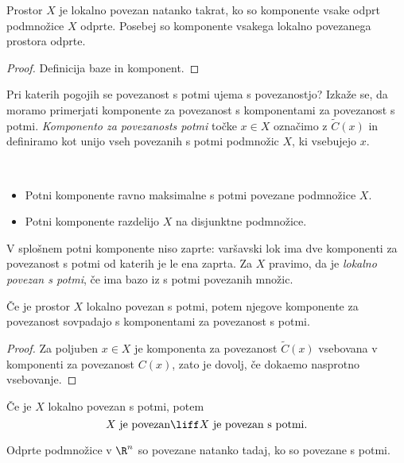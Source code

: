 \begin{trditev}
    Prostor $X$ je lokalno povezan natanko takrat, ko so komponente vsake odprt podmnožice $X$ odprte. Posebej so komponente vsakega lokalno povezanega prostora odprte.
\end{trditev}

\begin{proof}
    Definicija baze in komponent.
\end{proof}

Pri katerih pogojih se povezanost s potmi ujema s povezanostjo? Izkaže se, da moramo primerjati komponente za povezanost s komponentami za povezanost s potmi. \emph{Komponento za povezanosts potmi} točke $x \in X$ označimo z $\widetilde{C}(x)$ in definiramo kot unijo vseh povezanih s potmi podmnožic $X$, ki vsebujejo $x$.

\begin{opomba}
    \ 
    \begin{itemize}
        \item Potni komponente ravno maksimalne s potmi povezane podmnožice $X$.
        \item Potni komponente razdelijo $X$ na disjunktne podmnožice.
    \end{itemize}

    V splošnem potni komponente niso zaprte: varšavski lok ima dve komponenti za povezanost s potmi od katerih je le ena zaprta. Za $X$ pravimo, da je \emph{lokalno povezan s potmi}, če ima bazo iz s potmi povezanih množic.
\end{opomba}

\begin{izrek}
    Če je prostor $X$ lokalno povezan s potmi, potem njegove komponente za povezanost sovpadajo s komponentami za povezanost s potmi.
\end{izrek}

\begin{proof}
    Za poljuben $x \in X$ je komponenta za povezanost $\widetilde{C}(x)$ vsebovana v komponenti za povezanost $C(x)$, zato je dovolj, če dokaemo nasprotno vsebovanje.
\end{proof}

\begin{posledica}
    Če je $X$ lokalno povezan s potmi, potem 
    $$X \text{ je povezan} \liff X \text{ je povezan s potmi}.$$
\end{posledica}

\begin{posledica}
    Odprte podmnožice v $\R^n$ so povezane natanko tadaj, ko so povezane s potmi.
\end{posledica}

